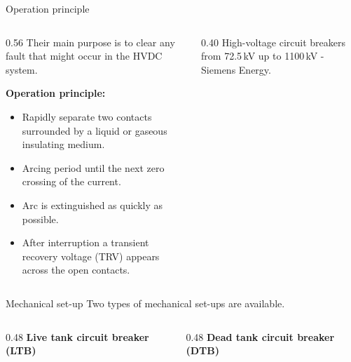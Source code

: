 
\begin{frame}{Operation principle}
  \begin{columns}[T,onlytextwidth]
    \begin{column}{0.56\textwidth}
      Their main purpose is to clear any fault that might occur in the
      HVDC system.

      \vspace{0.6em}
      \textbf{Operation principle:}
      \begin{itemize}
        \setlength{\itemsep}{0.35em}
        \item Rapidly separate two contacts surrounded by a liquid or
              gaseous insulating medium.
        \item Arcing period until the next zero crossing of the current.
        \item Arc is extinguished as quickly as possible.
        \item After interruption a transient recovery voltage (TRV) appears
              across the open contacts.
      \end{itemize}

    \end{column}
    \begin{column}{0.40\textwidth}
      \centering
      \vspace{-0.2em}
      {\color{atGray}\footnotesize High-voltage circuit breakers from 72.5\,kV up to 1100\,kV - Siemens Energy.}      
    \end{column}
  \end{columns}
\end{frame}

\begin{frame}{Mechanical set-up}
  Two types of mechanical set-ups are available.
  \vspace{1em} 
  \begin{columns}[c,onlytextwidth]
    \begin{column}{0.48\textwidth}
      \centering
      \textbf{Live tank circuit breaker (LTB)}\\[0.4em]
    \end{column}
    \begin{column}{0.48\textwidth}
      \centering
      \textbf{Dead tank circuit breaker (DTB)}\\[0.4em]
    \end{column}
  \end{columns}
\end{frame}


